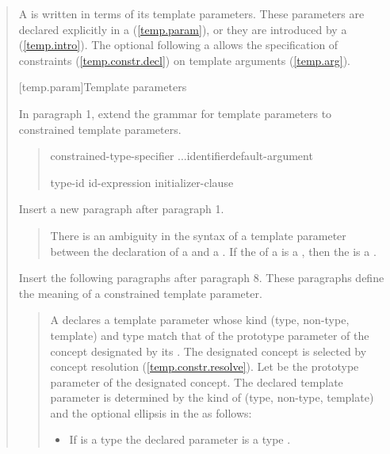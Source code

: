 \begin{quote}
\setcounter{Paras}{6}
\pnum
A  is written in terms of its template 
parameters. These parameters are declared explicitly in a 
 (\ref{temp.param}), or they are
introduced by a  (\ref{temp.intro}).
%
The optional  following a
 allows the specification of
constraints (\ref{temp.constr.decl}) on template arguments (\ref{temp.arg}).

[temp.param]{Template parameters}

In paragraph 1, extend the grammar for template parameters to 
constrained template parameters.

\begin{quote}
\pnum

\begin{bnf}
\br

\begin{addedblock}
\br
  constrained-type-specifier ...\opt identifier\opt default-argument\opt\br

\br
  \terminal{=} type-id\br
  \terminal{=} id-expression\br
  \terminal{=} initializer-clause\br
\end{addedblock}
\end{bnf}
\end{quote}

Insert a new paragraph after paragraph 1.

\begin{quote}
\pnum
There is an ambiguity in the syntax of a template parameter between the
declaration of a  and a
.
% 
If the  of a  
is a , then the 
 is a .
\end{quote}

Insert the following paragraphs after paragraph 8. These paragraphs
define the meaning of a constrained template parameter.

\begin{quote}
\setcounter{Paras}{8}
\pnum
A  declares a template parameter whose 
kind (type, non-type, template) and type match that of the prototype parameter 
of the concept designated by its .
% 
The designated concept is selected by concept resolution 
(\ref{temp.constr.resolve}).
% 
Let  be the prototype parameter of the designated concept. 
% 
The declared template parameter is determined by the kind of  
(type, non-type, template) and the optional ellipsis in the
 as follows:
% 
\begin{itemize}
\item If  is a type  the declared
parameter is a type . 


\end{itemize}
\end{quote}
\end{quote}

